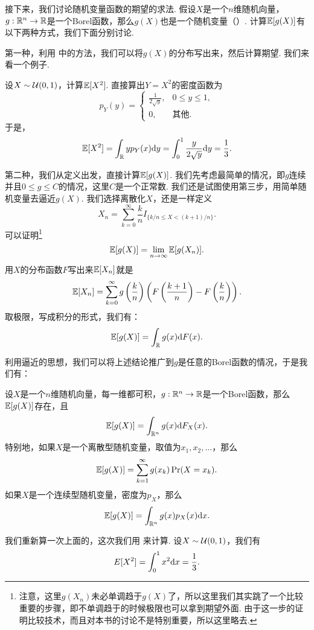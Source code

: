 接下来，我们讨论随机变量函数的期望的求法. 假设$X$是一个$n$维随机向量，$g:\mathbb{R}^n\to\mathbb{R}$是一个Borel函数，那么$g(X)$也是一个随机变量（）. 计算$\mathbb{E}[g(X)]$有以下两种方式，我们下面分别讨论. 

第一种，利用 中的方法，我们可以将$g(X)$的分布写出来，然后计算期望. 我们来看一个例子. 

\begin{example}\label{ex:uniform-square}
设$X\sim\mathcal{U}(0,1)$，计算$\mathbb{E}[X^2]$. 直接算出$Y=X^2$的密度函数为
\[p_Y(y)=\begin{cases}
    \frac{1}{2\sqrt{y}},&0\leq y\leq 1,\\
    0,&\text{其他}.
\end{cases}\]
于是，
\[\mathbb{E}[X^2]=\int_{\mathbb{R}} y p_Y(x)\mathrm{d} y=\int_0^1\frac{y}{2\sqrt{y}}\mathrm{d} y=\frac{1}{3}.\]
\end{example}

第二种，我们从定义出发，直接计算$\mathbb{E}[g(X)]$. 我们先考虑最简单的情况，即$g$连续并且$0\leq g\leq C$的情况，这里$C$是一个正常数. 我们还是试图使用第三步，用简单随机变量去逼近$g(X)$. 我们选择离散化$X$，还是一样定义
\[X_n=\sum_{k=0}^\infty\frac{k}{n}I_{\{k/n\leq X<(k+1)/n\}}.\]
可以证明\footnote{注意，这里$g(X_n)$未必单调趋于$g(X)$了，所以这里我们其实跳了一个比较重要的步骤，即不单调趋于的时候极限也可以拿到期望外面. 由于这一步的证明比较技术，而且对本书的讨论不是特别重要，所以这里略去. }
\[\mathbb{E}[g(X)]=\lim_{n\to\infty}\mathbb{E}[g(X_n)].\]
用$X$的分布函数$F$写出来$\mathbb{E}[X_n]$就是
\begin{align*}
    \mathbb{E}[X_n]=\sum_{k=0}^\infty g\left(\frac{k}{n}\right)\left(F\left(\frac{k+1}{n}\right)-F\left(\frac{k}{n}\right)\right).
\end{align*}
取极限，写成积分的形式，我们有：
\[\mathbb{E}[g(X)]=\int_{\mathbb{R}} g(x)\mathrm{d} F(x).\]

利用逼近的思想，我们可以将上述结论推广到$g$是任意的Borel函数的情况，于是我们有：

\begin{theorem}\label{thm:expectation-function}
设$X$是一个$n$维随机向量，每一维都可积，$g:\mathbb{R}^n\to\mathbb{R}$是一个Borel函数，那么$\mathbb{E}[g(X)]$存在，且
\[\mathbb{E}[g(X)]=\int_{\mathbb{R}^n} g(x)\mathrm{d} F_X(x).\]
特别地，如果$X$是一个离散型随机变量，取值为$x_1,x_2,\dots$，那么
\[\mathbb{E}[g(X)]=\sum_{k=1}^\infty g(x_k)\Pr(X=x_k).\]
如果$X$是一个连续型随机变量，密度为$p_X$，那么
\[\mathbb{E}[g(X)]=\int_{\mathbb{R}^n} g(x)p_X(x)\mathrm{d} x.\]
\end{theorem}

\begin{example}
我们重新算一次上面的，这次我们用 来计算. 设$X\sim\mathcal{U}(0,1)$，我们有
\[E[X^2]=\int_0^1 x^2\mathrm{d} x=\frac{1}{3}.\]
\end{example}

